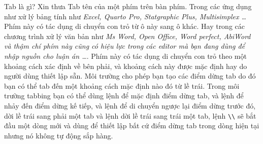 \documentclass[a4paper]{report}
\begin{document}
Tab là gì? Xin thưa Tab tên của một phím trên bàn phím. Trong các ứng dụng như xử lý bảng tính như \emph{Excel, Quarto Pro, Statgraphic Plus, Multisimplex \ldots} Phím này có tác dụng di chuyển con trỏ từ ô này sang ô khác. Hay trong các chương trình xử lý văn bản như \emph{Ms Word, Open Office, Word perfect, AbiWord và thậm chí phím này cũng có hiệu lực trong các editor mà bạn đang dùng để nhập nguồn cho luận án \ldots}. Phím này có tác dụng di chuyển con trỏ theo một khoảng cách xác định về bên phải, và khoảng cách này được mặc định hay do người dùng thiết lập sẵn.
\noindent Môi trường  cho phép bạn tạo các điểm dừng tab do đó bạn có thể tab đến một khoảng cách mặc định nào đó từ lề trái. Trong môi trường tabbing bạn có thể dùng lệnh \Com{=} để mặc định điểm dừng tab, và lệnh \Com{>} để nhảy đến  điểm dừng kế tiếp, và lệnh \Com{<} để di chuyển ngược lại điểm dừng trước đó, \Com{+} dời lề trái sang phải một tab và lệnh \Com{-} dời lề trái sang trái một tab, lệnh \verb|\\| sẽ bắt đầu một dòng mới và  dùng để thiết lập bất cứ điểm dừng tab trong dòng hiện tại nhưng nó không tự động sắp hàng.
\end{document}
